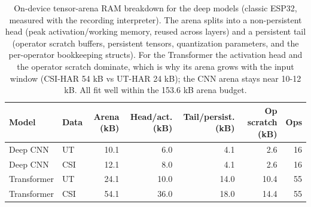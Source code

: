 \begin{table}[t]
\centering
\caption{On-device tensor-arena RAM breakdown for the deep models (classic ESP32,
measured with the recording interpreter). The arena splits into a non-persistent
head (peak activation/working memory, reused across layers) and a persistent tail
(operator scratch buffers, persistent tensors, quantization parameters, and the
per-operator bookkeeping structs). For the Transformer the activation head and the
operator scratch dominate, which is why its arena grows with the input window
(CSI-HAR 54 kB vs UT-HAR 24 kB); the CNN arena stays near 10-12 kB. All fit well
within the 153.6 kB arena budget.}
\label{tab:ram-breakdown}
\begin{tabular}{llrrrrr}
\hline
Model & Data & Arena (kB) & Head/act. (kB) & Tail/persist. (kB) & Op scratch (kB) & Ops \\
\hline
Deep CNN    & UT  & 10.1 & 6.0  & 4.1  & 2.6  & 16 \\
Deep CNN    & CSI & 12.1 & 8.0  & 4.1  & 2.6  & 16 \\
Transformer & UT  & 24.1 & 10.0 & 14.0 & 10.4 & 55 \\
Transformer & CSI & 54.1 & 36.0 & 18.0 & 14.4 & 55 \\
\hline
\end{tabular}
\end{table}


